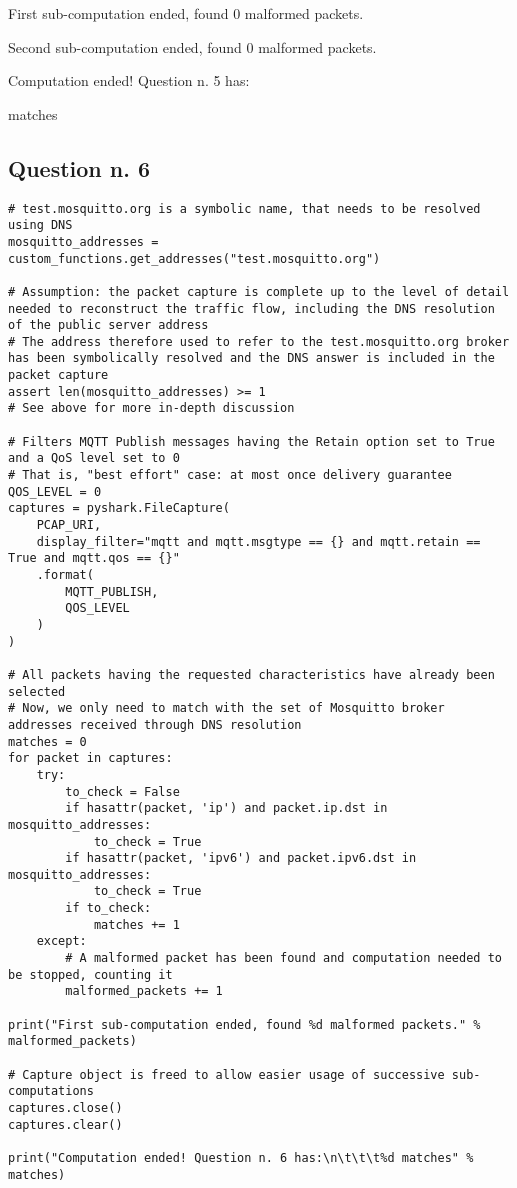 \documentclass[a4paper,11pt]{article} %
\begin{document}
    \begin{tcolorbox}
        First sub-computation ended, found 0 malformed packets.

        Second sub-computation ended, found 0 malformed packets.

        Computation ended! Question n. 5 has:

        \qquad \qquad {} matches
    \end{tcolorbox}

    \subsection{Question n. 6}\label{subsec:question-n.-6}

    \begin{verbatim}
# test.mosquitto.org is a symbolic name, that needs to be resolved using DNS
mosquitto_addresses = custom_functions.get_addresses("test.mosquitto.org")

# Assumption: the packet capture is complete up to the level of detail needed to reconstruct the traffic flow, including the DNS resolution of the public server address
# The address therefore used to refer to the test.mosquitto.org broker has been symbolically resolved and the DNS answer is included in the packet capture
assert len(mosquitto_addresses) >= 1
# See above for more in-depth discussion

# Filters MQTT Publish messages having the Retain option set to True and a QoS level set to 0
# That is, "best effort" case: at most once delivery guarantee
QOS_LEVEL = 0
captures = pyshark.FileCapture(
    PCAP_URI,
    display_filter="mqtt and mqtt.msgtype == {} and mqtt.retain == True and mqtt.qos == {}"
    .format(
        MQTT_PUBLISH,
        QOS_LEVEL
    )
)

# All packets having the requested characteristics have already been selected
# Now, we only need to match with the set of Mosquitto broker addresses received through DNS resolution
matches = 0
for packet in captures:
    try:
        to_check = False
        if hasattr(packet, 'ip') and packet.ip.dst in mosquitto_addresses:
            to_check = True
        if hasattr(packet, 'ipv6') and packet.ipv6.dst in mosquitto_addresses:
            to_check = True
        if to_check:
            matches += 1
    except:
        # A malformed packet has been found and computation needed to be stopped, counting it
        malformed_packets += 1

print("First sub-computation ended, found %d malformed packets." % malformed_packets)

# Capture object is freed to allow easier usage of successive sub-computations
captures.close()
captures.clear()

print("Computation ended! Question n. 6 has:\n\t\t\t%d matches" % matches)
    \end{verbatim}
\end{document}
